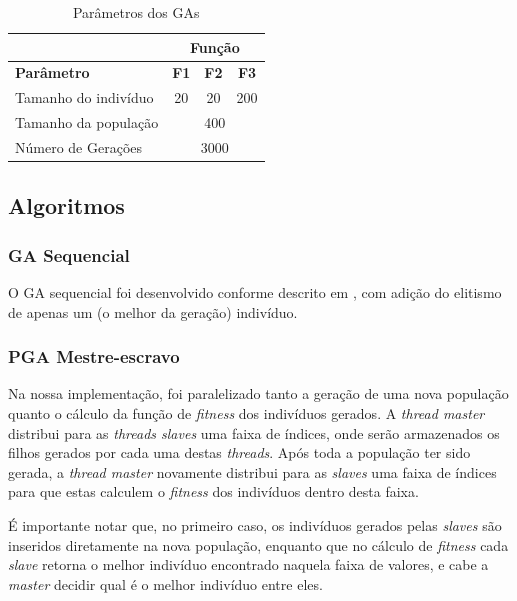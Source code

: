\documentclass[12pt]{article}
\begin{document}
\begin{table} 
  \centering
  \begin{tabular}{l|c|c|c|}
    \cline{2-4} 
     & \multicolumn{3}{|c|}{Função} \\ \hline
    \multicolumn{1}{|l|}{\textbf{Parâmetro}} & \textbf{F1} & \textbf{F2} & \textbf{F3} \\ \hline
    \multicolumn{1}{|l|}{Tamanho do indivíduo} & 20 & 20 & 200 \\ \hline
    \multicolumn{1}{|l|}{Tamanho da população} & \multicolumn{3}{|c|}{400} \\ \hline
    \multicolumn{1}{|l|}{Número de Gerações} & \multicolumn{3}{|c|}{3000} \\ \hline
  \end{tabular}
  \caption{Parâmetros dos GAs}
  \label{tab:param}
\end{table}

\subsection{Algoritmos} %
\label{sub:algoritmos}


\subsubsection{GA Sequencial} %
\label{ssub:ga_sequencial}

O GA sequencial foi desenvolvido conforme descrito em \cite{holland1975}, com adição do elitismo \cite{dejong1975} de apenas um (o melhor da geração) indivíduo.


\subsubsection{PGA Mestre-escravo} %
\label{ssub:pga_slave}

Na nossa implementação, foi paralelizado tanto a geração de uma nova população quanto o cálculo da função de \emph{fitness} dos indivíduos gerados. A \emph{thread master} distribui para as \emph{threads slaves} uma faixa de índices, onde serão armazenados os filhos gerados por cada uma destas \emph{threads}. Após toda a população ter sido gerada, a \emph{thread master} novamente distribui para as \emph{slaves} uma faixa de índices para que estas calculem o \emph{fitness} dos indivíduos dentro desta faixa.

É importante notar que, no primeiro caso, os indivíduos gerados pelas \emph{slaves} são inseridos diretamente na nova população, enquanto que no cálculo de \emph{fitness} cada \emph{slave} retorna o melhor indivíduo encontrado naquela faixa de valores, e cabe a \emph{master} decidir qual é o melhor indivíduo entre eles.
\end{document}
